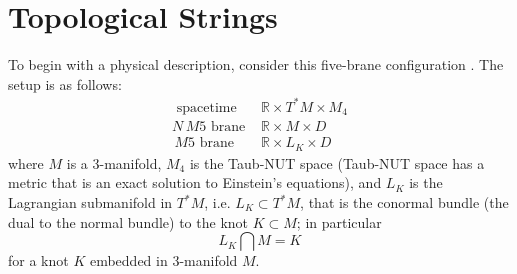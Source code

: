 \documentclass[a4paper,titlepage,twoside]{book}
\begin{document}
\section{Topological Strings}





To begin with a physical description, consider this five-brane configuration \cite{Witten2011}.  The setup is as follows:
\begin{equation}
  \begin{aligned}
    \text{ spacetime }  & \mathbb{R} \times T^*M \times M_4 \\ 
    N \, M5 \text{ brane } & \mathbb{R} \times M \times D \\ 
     \, M5 \text{ brane } & \mathbb{R} \times L_K \times D
\end{aligned} \label{Eq:M5theorysetup00}
\end{equation}
where $M$ is a 3-manifold, $M_4$ is the Taub-NUT space (Taub-NUT space has a metric that is an exact solution to Einstein's equations), and $L_K$ is the Lagrangian submanifold in $T^*M$, i.e. $L_K \subset T^*M$, that is the conormal bundle (the dual to the normal bundle) to the knot $K \subset M$; in particular
\begin{equation}
  L_K \bigcap M = K
\end{equation}
for a knot $K$ embedded in 3-manifold $M$.
\end{document}
